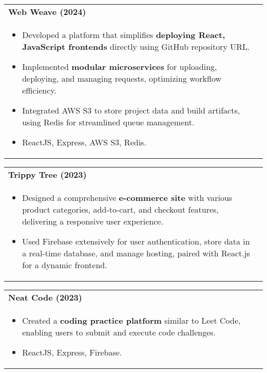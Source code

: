 \documentclass[a4paper,8pt]{article}
\begin{document}
\vspace{-2pt}

\begin{tabularx}{\linewidth}{ @{}l r@{} }
\textbf{{Web Weave (2024)}} \hfill \color[HTML]{371e77} \\[1pt]
\begin{minipage}[t]{\linewidth}
    \begin{itemize}[nosep,after=\strut, leftmargin=2em, itemsep=2pt]
        \item Developed a platform that simplifies \textbf{deploying React, JavaScript frontends} directly using GitHub repository URL.
        \item Implemented \textbf{modular microservices} for uploading, deploying, and managing requests, optimizing workflow efficiency.
        \item Integrated AWS S3 to store project data and build artifacts, using Redis for streamlined queue management.
        \item ReactJS, Express, AWS S3, Redis.
\end{itemize}
\end{minipage}
\end{tabularx}

\vspace{-2pt}

\begin{tabularx}{\linewidth}{ @{}l r@{} }
\textbf{{ Trippy Tree (2023)}} \hfill \color[HTML]{371e77} \\[1pt]
\begin{minipage}[t]{\linewidth}
    \begin{itemize}[nosep,after=\strut, leftmargin=2em, itemsep=2pt]
        \item Designed a comprehensive \textbf{e-commerce site} with various product categories, add-to-cart, and checkout features, delivering a responsive user experience.
        \item Used Firebase extensively for user authentication, store data in a real-time database, and manage hosting, paired with React.js for a dynamic frontend.
    \end{itemize}
\end{minipage}
\end{tabularx}

\vspace{-2pt}

\begin{tabularx}{\linewidth}{ @{}l r@{} }
\textbf{{ Neat Code (2023)}} \hfill \color[HTML]{371e77} \\[1pt]
\begin{minipage}[t]{\linewidth}
    \begin{itemize}[nosep,after=\strut, leftmargin=2em, itemsep=2pt]
        \item Created a \textbf{coding practice platform} similar to Leet Code, enabling users to submit and execute code challenges.
        \item ReactJS, Express, Firebase.
    \end{itemize}
\end{minipage}
\end{tabularx}
\end{document}
